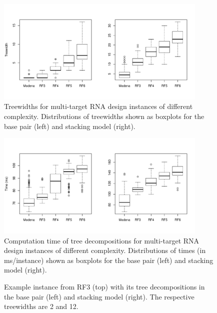 \documentclass[10pt]{article}
\makeatletter
\newlength{\@aligneps}
\newcommand{\includegraphicstop}[2][]{%
\sbox{\@alignepsbox}{\texttt{[image: \#2]}}%
\setlength{\@aligneps}{-\ht\@alignepsbox}%
\addtolength{\@aligneps}{2ex}%
\raisebox{\@aligneps}{\usebox{\@alignepsbox}}}
\makeatother
\begin{document}
\begin{figure}
  \centering\includegraphics[width=0.9\textwidth]{Figs/td-widths}
  \caption{Treewidths for multi-target RNA design instances of
    different complexity. Distributions of treewidths shown as boxplots for the base pair (left) and stacking model (right).}
  \label{fig:td-widths}
\end{figure}

\begin{figure}
  \centering
  \includegraphics[width=0.9\textwidth]{Figs/td-times}
  \caption{Computation time of tree decompositions for
    multi-target RNA design instances of different complexity.
    Distributions of times (in ms/instance) shown as boxplots for the base pair (left) and stacking model (right).}
  \label{fig:td-times}
\end{figure}


\begin{figure}[t!]
  \centering
  
  \includegraphicstop[width=0.6\textwidth]{Figs/td-example-basepair}%
  \includegraphicstop[width=0.35\textwidth]{Figs/td-example-stacking}
  \caption{Example instance from RF3 (top) with its tree decompositions in the base pair (left) and stacking model (right). The respective treewidths are 2 and 12.}
  \label{fig:td-example}
\end{figure}
\end{document}
